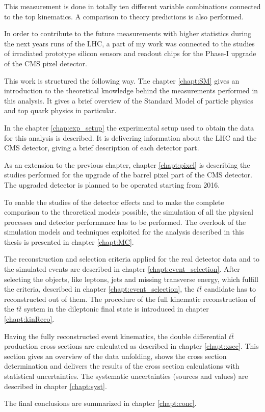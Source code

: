 This measurement is done in totally ten different variable combinations
connected to the top kinematics. A comparison to theory predictions is also performed.

In order to contribute to the future measurements with higher statistics during
the next years runs of the LHC, a part of my work was connected to the studies of irradiated
prototype silicon sensors and readout chips for the Phase-I upgrade of the CMS pixel detector.

This work is structured the following way. The chapter \ref{chapt:SM} gives an introduction to the theoretical
knowledge behind the measurements performed in this analysis. It gives a brief overview of the Standard
Model of particle physics and top quark physics in particular.

In the chapter \ref{chap:exp_setup} the experimental setup used to obtain the data for this analysis is described.
It is delivering information about the LHC and the CMS detector, giving a brief description of each detector part.

As an extension to the previous chapter, chapter \ref{chapt:pixel} is describing the studies performed for the
upgrade of the barrel pixel part of the CMS detector. The upgraded detector is planned to be operated starting from 2016.

To enable the studies of the detector effects and to make the complete comparison to the theoretical models possible,
the simulation of all the physical processes and detector performance has to be performed. The overlook of the simulation
models and techniques exploited for the analysis described in this thesis is presented in chapter \ref{chapt:MC}.

The reconstruction and selection criteria applied for the real detector data and to the simulated events are described
in chapter \ref{chapt:event_selection}. After selecting the objects, like leptons, jets and missing transverse energy, which 
fulfill the criteria, described in chapter \ref{chapt:event_selection}, the $t\bar{t}$ candidate has to reconstructed out
of them. The procedure of the full kinematic reconstruction of the $t\bar{t}$ system in the dileptonic final state is introduced
in chapter \ref{chapt:kinReco}.

Having the fully reconstructed event kinematics, the double differential $t\bar{t}$ production cross sections are calculated
as described in chapter \ref{chapt:xsec}. This section gives an overview of the data unfolding, shows the cross section determination 
and delivers the results of the cross section calculations with statistical uncertainties. The systematic uncertainties (sources and 
values) are described in chapter \ref{chapt:syst}.

The final conclusions are summarized in chapter \ref{chapt:conc}.